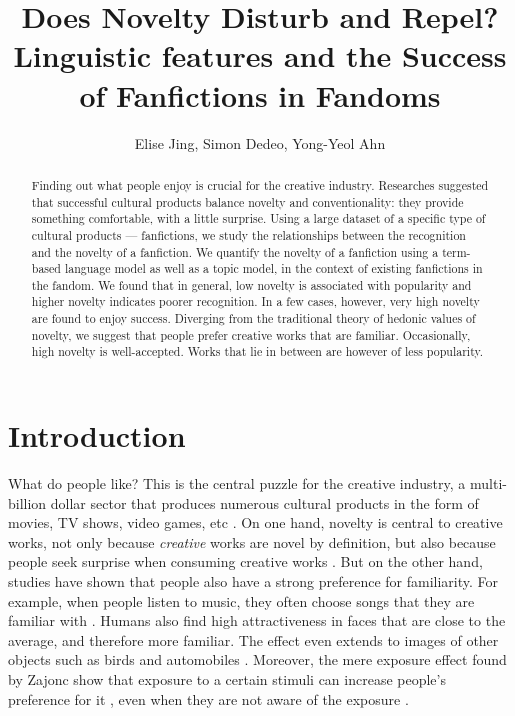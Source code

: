 \documentclass[letterpaper]{article} %
\begin{document}
%
\title{Does Novelty Disturb and Repel? Linguistic features and the Success of Fanfictions in Fandoms}
\author{Elise Jing, Simon Dedeo, Yong-Yeol Ahn\\
}
\maketitle
\begin{abstract}
Finding out what people enjoy is crucial for the creative industry. Researches suggested that successful cultural products balance novelty and conventionality: they provide something comfortable, with a little surprise. Using a large dataset of a specific type of cultural products --- fanfictions, we study the relationships between the recognition and the novelty of a fanfiction. We quantify the novelty of a fanfiction using a term-based language model as well as a topic model, in the context of existing fanfictions in the fandom. We found that in general, low novelty is associated with popularity and higher novelty indicates poorer recognition. In a few cases, however, very high novelty are found to enjoy success. Diverging from the traditional theory of hedonic values of novelty, we suggest that people prefer creative works that are familiar. Occasionally, high novelty is well-accepted. Works that lie in between are however of less popularity.
\end{abstract}

\section*{Introduction}
\noindent 
What do people like? This is the central puzzle for the creative industry, a multi-billion dollar sector that produces numerous cultural products in the form of movies, TV shows, video games, etc \cite{creativeindustries}. On one hand, novelty is central to creative works, not only because \emph{creative} works are novel by definition, but also because people seek surprise when consuming creative works \cite{hutter2011infinite}. But on the other hand, studies have shown that people also have a strong preference for familiarity. For example, when people listen to music, they often choose songs that they are familiar with \cite{thompson2014shazam}. Humans also find high attractiveness in faces that are close to the average, and therefore more familiar. 
The effect even extends to images of other objects such as birds and automobiles \cite{Halberstadt2003}. Moreover, the mere exposure effect found by Zajonc show that exposure to a certain stimuli can increase people's preference for it \cite{zajonc1968attitudinal}, even when they are not aware of the exposure \cite{kunst1980affective} \cite{bornstein1989exposure}.
\end{document}

